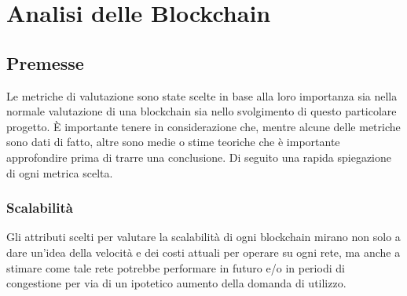 \documentclass[a4paper, 12pt]{article}
\begin{document}
\makefrontpage

\section{Analisi delle Blockchain}

\subsection*{Premesse}
Le metriche di valutazione sono state scelte in base alla loro importanza sia nella normale valutazione di una blockchain sia nello svolgimento di questo particolare progetto.
È importante tenere in considerazione che, mentre alcune delle metriche sono dati di fatto, altre sono medie o stime teoriche che è importante approfondire prima di trarre una conclusione.
Di seguito una rapida spiegazione di ogni metrica scelta.

\subsubsection*{Scalabilità}
Gli attributi scelti per valutare la scalabilità di ogni blockchain mirano non solo a dare un'idea della velocità e dei costi attuali per operare su ogni rete, ma anche a stimare come tale
rete potrebbe performare in futuro e/o in periodi di congestione per via di un ipotetico aumento della domanda di utilizzo.
\end{document}
